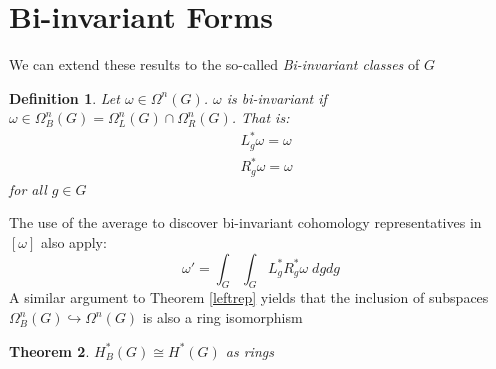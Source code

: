 \documentclass[12pt]{amsart}
\newtheorem{theorem}{Theorem}[section]
\newtheorem{definition}[theorem]{Definition}
\numberwithin{equation}{section}
\begin{document}
\section{Bi-invariant Forms}
We can extend these results to the so-called \emph{Bi-invariant classes} of $G$
%
\begin{definition}
  Let $\omega \in \Omega^n(G)$. $\omega$ is bi-invariant if $\omega \in \Omega_B^n(G) = \Omega_L^n(G) \cap \Omega_R^n(G)$. That is:
  \begin{align*}
    & L^*_g\omega = \omega \\
    &  R^*_g\omega = \omega
  \end{align*}
  for all $g \in G$
\end{definition}
%
The use of the average to discover bi-invariant cohomology representatives in $[\omega]$ also apply:
\begin{equation}
  \omega' = \int_{G}\int_{G} L^*_{g}R^*_{g}\omega \; dg dg
\end{equation}
A similar argument to Theorem \ref{leftrep} yields that the inclusion of subspaces $\Omega_B^n(G) \hookrightarrow \Omega^n(G)$ is also a ring isomorphism
%
\begin{theorem}
  $H_B^{*}(G) \cong H^*(G)$ as rings
\end{theorem}



\end{document}
